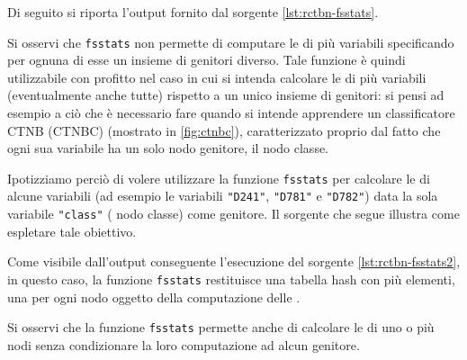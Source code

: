 Di seguito si riporta l'output fornito dal sorgente \ref{lst:rctbn-fsstats}.

\vspace*{8pt}\vspace*{8pt}

Si osservi che \lstinline[language=rstats]{fsstats} non permette di computare le \emph{\stats{}} di più variabili specificando per ognuna di esse un insieme di genitori diverso. Tale funzione è quindi utilizzabile con profitto nel caso in cui si intenda calcolare le \emph{\stats{}} di più variabili (eventualmente anche tutte) rispetto a un unico insieme di genitori: si pensi ad esempio a ciò che è necessario fare quando si intende apprendere un classificatore \acs{CTNB} (\acs{CTNBC}) (mostrato in \vref{fig:ctnbc}), caratterizzato proprio dal fatto che ogni sua variabile ha un solo nodo genitore, il nodo classe.

Ipotizziamo perciò di volere utilizzare la funzione \lstinline[language=rstats]{fsstats} per calcolare le \emph{\stats{}} di alcune variabili (ad esempio le variabili \lstinline[language=rstats]{"D241"}, \lstinline[language=rstats]{"D781"} e \lstinline[language=rstats]{"D782"}) data la sola variabile \lstinline[language=rstats]{"class"} (\ie{} nodo classe) come genitore. Il sorgente che segue illustra come espletare tale obiettivo.

\vspace*{8pt}

Come visibile dall'output conseguente l'esecuzione del sorgente \ref{lst:rctbn-fsstats2}, in questo caso, la funzione \lstinline[language=rstats]{fsstats} restituisce una tabella hash con più elementi, una per ogni nodo oggetto della computazione delle \emph{\stats{}}.

\vspace*{8pt}\vspace*{8pt}

Si osservi che la funzione \lstinline[language=rstats]{fsstats} permette anche di calcolare le \emph{\stats{}} di uno o più nodi senza condizionare la loro computazione ad alcun genitore.

